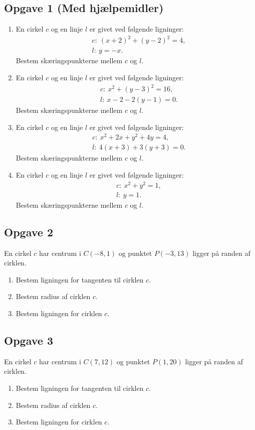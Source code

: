 \subsection*{Opgave 1 (Med hjælpemidler)}
\begin{enumerate}[label=\roman*)]
	\item En cirkel $c$ og en linje $l$ er givet ved følgende ligninger:
	\begin{align*}
		&c: \ (x+2)^2+(y-2)^2 = 4, \\
		&l: \ y = -x.
	\end{align*}
	Bestem skæringspunkterne mellem $c$ og $l$. 
	\item En cirkel $c$ og en linje $l$ er givet ved følgende ligninger:
	\begin{align*}
		&c: \ x^2+(y-3)^2 = 16, \\
		&l: \ x-2 - 2(y-1) = 0.
	\end{align*}
	Bestem skæringspunkterne mellem $c$ og $l$. 
	\item En cirkel $c$ og en linje $l$ er givet ved følgende ligninger:
	\begin{align*}
		&c: \ x^2+2x+y^2+4y = 4, \\
		&l: \ 4(x+3)+3(y+3)=0.
	\end{align*}
	Bestem skæringspunkterne mellem $c$ og $l$. 
	\item En cirkel $c$ og en linje $l$ er givet ved følgende ligninger:
	\begin{align*}
		&c: \ x^2+y^2=1, \\
		&l: \ y=1.
	\end{align*}
	Bestem skæringspunkterne mellem $c$ og $l$.
\end{enumerate}

\subsection*{Opgave 2}
En cirkel $c$ har centrum i $C(-8,1)$ og punktet $P(-3,13)$ ligger på randen af cirklen.
\begin{enumerate}[label=\roman*)]
	\item Bestem ligningen for tangenten til cirklen $c$.
	\item Bestem radius af cirklen $c$. 
	\item Bestem ligningen for cirklen $c$. 
\end{enumerate}

\subsection*{Opgave 3}
En cirkel $c$ har centrum i $C(7,12)$ og punktet $P(1,20)$ ligger på randen af cirklen.
\begin{enumerate}[label=\roman*)]
	\item Bestem ligningen for tangenten til cirklen $c$.
	\item Bestem radius af cirklen $c$. 
	\item Bestem ligningen for cirklen $c$. 
\end{enumerate}

